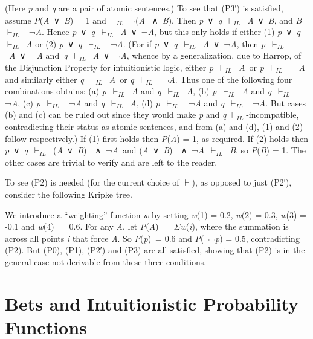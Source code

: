 \documentclass[
  10pt,
  letterpaper,
  DIV=11,
  numbers=noendperiod,
  twoside]{scrartcl}
\begin{document}
(Here \emph{p} and \emph{q} are a pair of atomic sentences.) To see that
(P3′) is satisfied, assume \emph{P}(\emph{A}~∨~\emph{B}) = 1 and
\(\vdash_{IL}\) ¬(\emph{A} ~∧~\emph{B}). Then
\emph{p}~∨~\emph{q}~\(\vdash_{IL}\)~\emph{A}~∨~\emph{B}, and
\emph{B}~\(\vdash_{IL}\)~ ¬\emph{A}. Hence
\emph{p}~∨~\emph{q}~\(\vdash_{IL}\)~\emph{A}~∨~¬\emph{A}, but this only
holds if either (1) \emph{p}~∨~\emph{q}~\(\vdash_{IL}\)~\emph{A} or (2)
\emph{p}~∨~\emph{q}~\(\vdash_{IL}\)~ ¬\emph{A}. (For if
\emph{p}~∨~\emph{q}~\(\vdash_{IL}\)~\emph{A}~∨~¬\emph{A}, then
\emph{p}~\(\vdash_{IL}\)~\emph{A}~∨~¬\emph{A}
and~\emph{q}~\(\vdash_{IL}\)~\emph{A}~∨~¬\emph{A}, whence by a
generalization, due to Harrop, of the Disjunction Property for
intuitionistic logic, either \emph{p}~\(\vdash_{IL}\)~\emph{A}~or
\emph{p}~\(\vdash_{IL}\)~ ¬\emph{A} and similarly either
\emph{q}~\(\vdash_{IL}\)~\emph{A}~or \emph{q}~\(\vdash_{IL}\)~
¬\emph{A}. Thus one of the following four combinations obtains: (a)
\emph{p}~\(\vdash_{IL}\)~\emph{A} and \emph{q}~\(\vdash_{IL}\)~\emph{A},
(b) \emph{p}~\(\vdash_{IL}\)~\emph{A} and \emph{q}~\(\vdash_{IL}\)~
¬\emph{A}, (c) \emph{p}~\(\vdash_{IL}\)~ ¬\emph{A} and
\emph{q}~\(\vdash_{IL}\)~\emph{A}, (d) \emph{p}~\(\vdash_{IL}\)~
¬\emph{A} and \emph{q}~\(\vdash_{IL}\)~ ¬\emph{A}. But cases (b) and (c)
can be ruled out since they would make \emph{p} and \emph{q}
\(\vdash_{IL}\)-incompatible, contradicting their status as atomic
sentences, and from (a) and (d), (1) and (2) follow respectively.) If
(1) first holds then \emph{P}(\emph{A}) = 1, as required. If (2) holds
then
\emph{p}~∨~\emph{q}~\(\vdash_{IL}\)~(\emph{A}~∨~\emph{B})~~∧~¬\emph{A}~and
(\emph{A}~∨~\emph{B})~~∧~¬\emph{A}~\(\vdash_{IL}\)~\emph{B}, so
\emph{P}(\emph{B}) = 1. The other cases are trivial to verify and are
left to the reader.

To see (P2) is needed (for the current choice of \(\vdash\)), as opposed
to just (P2′), consider the following Kripke tree.

We introduce a ``weighting'' function \emph{w} by setting \emph{w}(1) =
0.2, \emph{w}(2) = 0.3, \emph{w}(3) = -0.1 and \emph{w}(4)~=~0.6. For
any \emph{A}, let \emph{P}(\emph{A})~=~\({\Sigma}\)\emph{w}(\emph{i}),
where the summation is across all points \emph{i} that force \emph{A}.
So \emph{P}(\emph{p})~= 0.6 and \emph{P}(\({\lnot}{\lnot}\)\emph{p}) =
0.5, contradicting (P2). But (P0), (P1), (P2′) and (P3) are all
satisfied, showing that (P2) is in the general case not derivable from
these three conditions.

\section{Bets and Intuitionistic Probability
Functions}\label{bets-and-intuitionistic-probability-functions}
\end{document}
